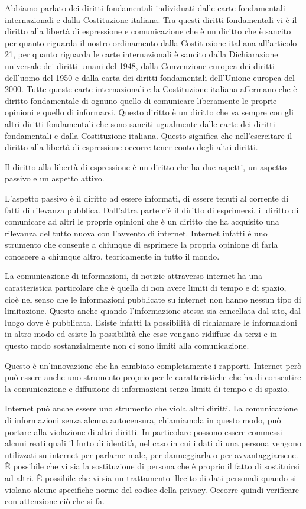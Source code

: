 Abbiamo parlato dei diritti fondamentali individuati dalle carte fondamentali internazionali e dalla Costituzione italiana. Tra questi diritti fondamentali vi è il diritto alla libertà di espressione e comunicazione che è un diritto che è sancito per quanto riguarda il nostro ordinamento dalla Costituzione italiana all'articolo 21, per quanto riguarda le carte internazionali è sancito dalla Dichiarazione universale dei diritti umani del 1948, dalla Convenzione europea dei diritti dell'uomo del 1950 e dalla carta dei diritti fondamentali dell'Unione europea del 2000.
Tutte queste carte internazionali e la Costituzione italiana affermano che è diritto fondamentale di ognuno quello di comunicare liberamente le proprie opinioni e quello di informarsi. Questo diritto è un diritto che va sempre con gli altri diritti fondamentali che sono sanciti ugualmente dalle carte dei diritti fondamentali e dalla Costituzione italiana. Questo significa che nell'esercitare il diritto alla libertà di espressione occorre tener conto degli altri diritti.

Il diritto alla libertà di espressione è un diritto che ha due aspetti, un aspetto passivo e un aspetto attivo. 

L'aspetto passivo è il diritto ad essere informati, di essere tenuti al corrente di fatti di rilevanza pubblica. Dall'altra parte c'è il diritto di esprimersi, il diritto di comunicare ad altri le proprie opinioni che è un diritto che ha acquisito una rilevanza del tutto nuova con l'avvento di internet. Internet infatti è uno strumento che consente a chiunque di esprimere la propria opinione di farla conoscere a chiunque altro, teoricamente in tutto il mondo.

La comunicazione di informazioni, di notizie attraverso internet ha una caratteristica particolare che è quella di non avere limiti di tempo e di spazio, cioè nel senso che le informazioni pubblicate su internet non hanno nessun tipo di limitazione. Questo anche quando l'informazione stessa sia cancellata dal sito, dal luogo dove è pubblicata. Esiste infatti la possibilità di richiamare le informazioni in altro modo ed esiste la possibilità che esse vengano ridiffuse da terzi e in questo modo sostanzialmente non ci sono limiti alla comunicazione.

Questo è un'innovazione che ha cambiato completamente i rapporti. Internet però può essere anche uno strumento proprio per le caratteristiche che ha di consentire la comunicazione e diffusione di informazioni senza limiti di tempo e di spazio. 

Internet può anche essere uno strumento che viola altri diritti. La comunicazione di informazioni senza alcuna autocensura, chiamiamola in questo modo, può portare alla violazione di altri diritti. In particolare possono essere commessi alcuni reati quali il furto di identità, nel caso in cui i dati di una persona vengono utilizzati su internet per parlarne male, per danneggiarla o per avvantaggiarsene. È possibile che vi sia la sostituzione di persona che è proprio il fatto di sostituirsi ad altri. È possibile che vi sia un trattamento illecito di dati personali quando si violano alcune specifiche norme del codice della privacy. Occorre quindi verificare con attenzione ciò che si fa.